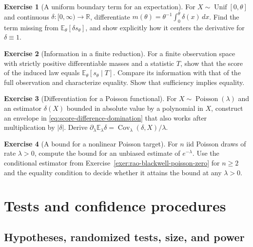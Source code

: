 \documentclass[11pt,oneside]{book}
\theoremstyle{definition}
\newtheorem{exercise}{Exercise}[section]
\theoremstyle{remark}
\newcommand{\R}{\mathbb R}
\begin{document}
\begin{exercise}[A uniform boundary term for an expectation]
\label{exer:fisher-uniform-expectation-boundary}
For $X\sim\operatorname{Unif}[0,\theta]$ and continuous
$\delta:[0,\infty)\to\R$, differentiate
$m(\theta)=\theta^{-1}\int_0^\theta\delta(x)\,dx$.
Find the term missing from $\mathbb E_\theta[\delta s_\theta]$,
and show explicitly how it centers the derivative for
$\delta\equiv1$.
\end{exercise}

\begin{exercise}[Information in a finite reduction]
\label{exer:fisher-finite-statistic-contraction}
For a finite observation space with strictly positive
differentiable masses and a statistic $T$, show that the score
of the induced law equals $\mathbb E_\theta[s_\theta\mid T]$.
Compare its information with that of the full observation
and characterize equality. Show that sufficiency implies equality.
\end{exercise}

\begin{exercise}[Differentiation for a Poisson functional]
\label{exer:fisher-poisson-polynomial-envelope}
For $X\sim\operatorname{Poisson}(\lambda)$ and an estimator
$\delta(X)$ bounded in absolute value by a polynomial in $X$,
construct an envelope in
\eqref{eq:score-difference-domination} that also works after
multiplication by $|\delta|$. Derive
$\partial_\lambda\mathbb E_\lambda\delta=
\operatorname{Cov}_\lambda(\delta,X)/\lambda$.
\end{exercise}

\begin{exercise}[A bound for a nonlinear Poisson target]
\label{exer:cramer-rao-poisson-zero-probability}
For $n$ iid Poisson draws of rate $\lambda>0$, compute the
bound for an unbiased estimate of $e^{-\lambda}$. Use the
conditional estimator from Exercise~\ref{exer:rao-blackwell-poisson-zero}
for $n\geq2$ and the equality condition to decide whether it
attains the bound at any $\lambda>0$.
\end{exercise}



\chapter{Tests and confidence procedures}
\label{chap:tests-confidence}
\section{Hypotheses, randomized tests, size, and power}
\label{sec:hypotheses-size-power}
\end{document}

